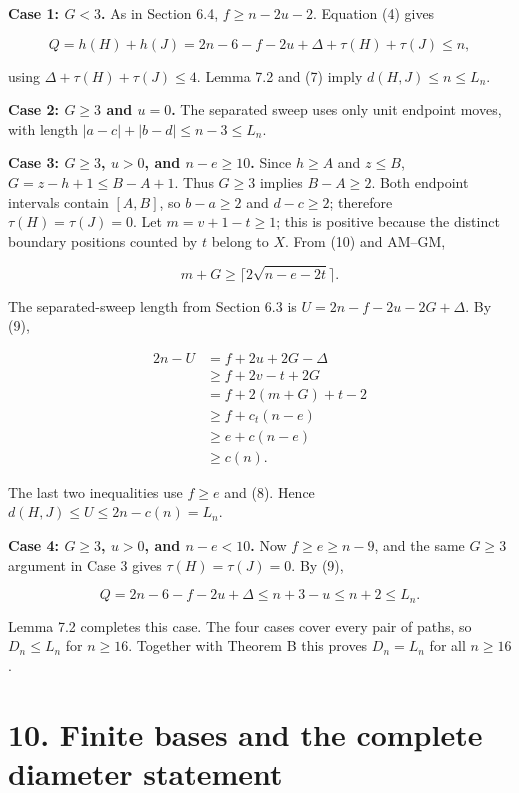 \documentclass[11pt,a4paper]{article}
\begin{document}
\textbf{Case 1: \(G<3\).} As in Section 6.4, \(f\ge n-2u-2\). Equation (4) gives

\[ Q=h(H)+h(J)=2n-6-f-2u+\Delta+\tau(H)+\tau(J)\le n, \]

using \(\Delta+\tau(H)+\tau(J)\le4\). Lemma 7.2 and (7) imply \(d(H,J)\le n\le L_n\).

\textbf{Case 2: \(G\ge3\) and \(u=0\).} The separated sweep uses only unit endpoint moves, with length \(|a-c|+|b-d|\le n-3\le L_n\).

\textbf{Case 3: \(G\ge3\), \(u>0\), and \(n-e\ge10\).} Since \(h\ge A\) and \(z\le B\), \(G=z-h+1\le B-A+1\). Thus \(G\ge3\) implies \(B-A\ge2\). Both endpoint intervals contain \([A,B]\), so \(b-a\ge2\) and \(d-c\ge2\); therefore \(\tau(H)=\tau(J)=0\). Let \(m=v+1-t\ge1\); this is positive because the distinct boundary positions counted by \(t\) belong to \(X\). From (10) and AM--GM,

\[ m+G\ge\lceil2\sqrt{n-e-2t}\rceil. \]

The separated-sweep length from Section 6.3 is \(U=2n-f-2u-2G+\Delta\). By (9),

\[
\begin{aligned}
2n-U
&=f+2u+2G-\Delta\\
&\ge f+2v-t+2G\\
&=f+2(m+G)+t-2\\
&\ge f+c_t(n-e)\\
&\ge e+c(n-e)\\
&\ge c(n).
\end{aligned}
\]

The last two inequalities use \(f\ge e\) and (8). Hence \(d(H,J)\le U\le2n-c(n)=L_n\).

\textbf{Case 4: \(G\ge3\), \(u>0\), and \(n-e<10\).} Now \(f\ge e\ge n-9\), and the same \(G\ge3\) argument in Case 3 gives \(\tau(H)=\tau(J)=0\). By (9),

\[ Q=2n-6-f-2u+\Delta\le n+3-u\le n+2\le L_n. \]

Lemma 7.2 completes this case. The four cases cover every pair of paths, so \(D_n\le L_n\) for \(n\ge16\). Together with Theorem B this proves \(D_n=L_n\) for all \(n\ge16\).

\hypertarget{finite-bases-and-the-complete-diameter-statement}{%
\section{10. Finite bases and the complete diameter statement}\label{finite-bases-and-the-complete-diameter-statement}}
\end{document}
